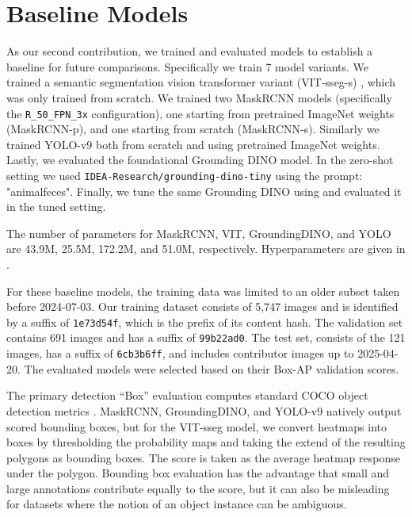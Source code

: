 \section{Baseline Models}
\label{sec:models}



As our second contribution, we trained and evaluated models to establish a baseline for future comparisons.
Specifically we train 7 model variants.
We trained a semantic segmentation vision transformer variant (VIT-sseg-s)
  \cite{Greenwell_2024_WACV,crall_geowatch_2024}, which was only trained from scratch.
We trained two MaskRCNN \cite{he2017mask} models (specifically the \texttt{R\_50\_FPN\_3x} configuration),
  one starting from pretrained ImageNet weights (MaskRCNN-p), and one starting from scratch
  (MaskRCNN-s).
Similarly we trained YOLO-v9 \cite{wang2024yolov9} both from scratch and using pretrained ImageNet weights.
Lastly, we evaluated the foundational Grounding DINO \cite{liu_grounding_2024} model. 
In the zero-shot setting we used \texttt{IDEA-Research/grounding-dino-tiny} using the prompt: "animalfeces".
Finally, we tune the same Grounding DINO using \cite{OpenGroundingDino} and evaluated it in the tuned setting.

The number of parameters for MaskRCNN, VIT, GroundingDINO, and YOLO are 43.9M, 25.5M, 172.2M, and 51.0M,
  respectively.
Hyperparameters are given in .

For these baseline models, the training data was limited to an older subset taken before 2024-07-03.
Our training dataset consists of 5,747 images and is identified by a suffix of {\tt 1e73d54f}, which is the
  prefix of its content hash.
The validation set contains 691 images and has a suffix of {\tt 99b22ad0}.
The test set, consists of the 121 images, has a suffix of {\tt 6cb3b6ff}, and includes contributor images
  up to 2025-04-20.
The evaluated models were selected based on their Box-AP validation scores.

The primary detection ``Box'' evaluation computes standard COCO object detection metrics
  \cite{lin_microsoft_2014}.
MaskRCNN, GroundingDINO, and YOLO-v9 natively output scored bounding boxes, but for the VIT-sseg model, we convert heatmaps into boxes
  by thresholding the probability maps and taking the extend of the resulting polygons as bounding
  boxes.
The score is taken as the average heatmap response under the polygon.
Bounding box evaluation has the advantage that small and large annotations contribute equally to the score,
  but it can also be misleading for datasets where the notion of an object instance can be ambiguous.

